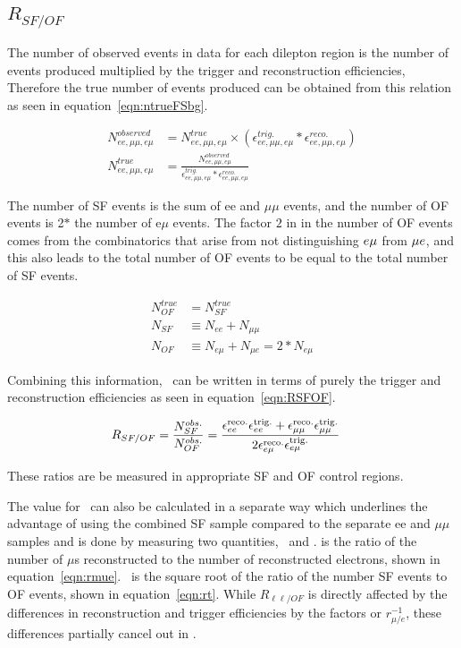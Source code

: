 \subsection{$R_{SF/OF}$}
The number of observed events in data for each dilepton region is the number of events produced multiplied by the trigger and reconstruction efficiencies,
Therefore the true number of events produced can be obtained from this relation as seen in equation~\ref{eqn:ntrueFSbg}.

\begin{align}
  N_{ee, \mu\mu, e\mu }^{observed} & = N_{ee, \mu\mu, e\mu }^{true} \times (\epsilon_{ee, \mu\mu, e\mu }^{trig.} * \epsilon_{ee, \mu\mu, e\mu }^{reco.})\\
  \label{eqn:ntrueFSbg} N_{ee, \mu\mu, e\mu }^{true} & = \frac{N_{ee, \mu\mu, e\mu }^{observed}}{\epsilon_{ee, \mu\mu, e\mu }^{trig.} * \epsilon_{ee, \mu\mu, e\mu }^{reco.}}
\end{align}

The number of SF events is the sum of ee and $\mu\mu$ events, and the number of OF events is 2$*$ the number of e$\mu$ events.
The factor $2$ in in the number of OF events comes from the combinatorics that arise from not distinguishing $\relax{e}\mu$ from $\mu\relax{e}$,
and this also leads to the total number of OF events to be equal to the total number of SF events.

\begin{align}
  \label{eqn:noftrueFSbg} N_{OF}^{true} & = N_{SF}^{true}\\  
  N_{SF} & \equiv N_{ee} + N_{\mu\mu}\\ 
  N_{OF} & \equiv N_{e\mu}+N_{\mu e} = 2 * N_{e\mu}
\end{align}

Combining this information, \rsfof\ can be written in terms of purely the trigger and reconstruction efficiencies as seen in equation~\ref{eqn:RSFOF}.

\begin{align}
  \label{eqn:RSFOF} R_{SF/OF}     & = \frac{N_{SF}^{obs.}}{N_{OF}^{obs.}}
  = \frac{\epsilon_{\relax{e}\relax{e}}^\mathrm{reco.}\epsilon_{\relax{e}\relax{e}}^\mathrm{trig.} + \epsilon_{\mu\mu}^\mathrm{reco.}\epsilon_{\mu\mu}^\mathrm{trig.}}{2\epsilon_{e\mu}^\mathrm{reco.}\epsilon_{e\mu}^\mathrm{trig.}}
\end{align}

These ratios are be measured in appropriate SF and OF control regions.

\clearpage

The value for \rsfof\ can also be calculated in a separate way which underlines
the advantage of using the combined SF sample compared to the separate ee and $\mu\mu$ samples
and is done by measuring two quantities, \rmue\ and \rt.
\rmue is the ratio of the number of $\mu$s reconstructed to the number of reconstructed electrons, shown in equation~\ref{eqn:rmue}.
\rt\ is the square root of the ratio of the number SF events to OF events, shown in equation~\ref{eqn:rt}.
While $R_{\ell\ell/OF}$ is directly affected by the differences in reconstruction and trigger efficiencies by the factors \rmue 
or $r_{\mu/e}^{-1}$, these differences partially cancel out in \rsfof.


